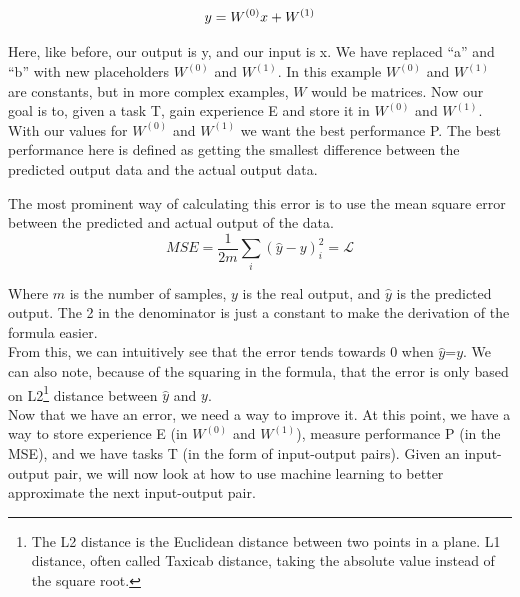 \begin{equation}
y=W^{(0)}x+W^{(1)}\\
\label{eq:ML_lin}
\end{equation}

\noindent Here, like before, our output is y, and our input is x. We have replaced ``a'' and ``b'' with new placeholders $W^{(0)}$ and $W^{(1)}$. In this example  $W^{(0)}$ and $W^{(1)}$ are constants, but in more complex examples, $W$ would be matrices.
Now our goal is to, given a task T, gain experience E and store it in $W^{(0)}$ and $W^{(1)}$. With our values for $W^{(0)}$ and $W^{(1)}$ we want the best performance P.  The best performance here is defined as getting the smallest difference between the predicted output data and the actual output data. 

\noindent The most prominent way of calculating this error is to use the mean square error between the predicted and actual output of the data. 
\begin{equation}\label{eq:MSE_form}
     MSE=\frac{1}{2m} \sum_i (\hat{y}-y)_i^2 =\mathcal{L}
\end{equation}

Where $m$ is the number of samples, $y$ is the real output, and $\hat{y}$ is the predicted output. The 2 in the denominator is just a constant to make the derivation of the formula easier.\\
From this, we can intuitively see that the error tends towards 0 when $\hat{y}$=$y$. We can also note, because of the squaring in the formula, that the error is only based on L2\footnote{The L2 distance is the Euclidean distance between two points in a plane. L1 distance, often called Taxicab distance, taking the absolute value instead of the square root.} distance between $\hat{y}$ and $y$.\\
Now that we have an error, we need a way to improve it.
At this point, we have a way to store experience E (in  $W^{(0)}$ and $W^{(1)}$), measure performance P (in the MSE), and we have tasks T (in the form of input-output pairs).
Given an input-output pair, we will now look at how to use machine learning to better approximate the next input-output pair.

